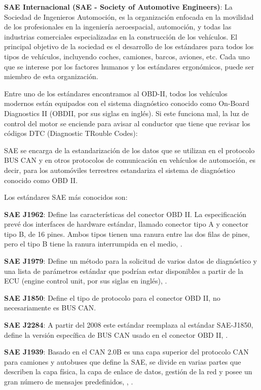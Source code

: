 \textbf{ SAE Internacional (SAE - Society of Automotive Engineers)}: La Sociedad de Ingenieros Automoción, es la organización enfocada en la movilidad de los profesionales en la ingeniería aeroespacial, automoción, y todas las industrias comerciales especializadas en la construcción de los vehículos. El principal objetivo de la sociedad es el desarrollo de los estándares para todos los tipos de vehículos, incluyendo coches, camiones, barcos, aviones, etc. Cada uno que se interese por los factores humanos y los estándares ergonómicos, puede ser miembro de esta organización. 

Entre uno de los estándares encontramos al OBD-II, todos los vehículos modernos están equipados con el sistema diagnóstico conocido como On-Board Diagnostics II (OBDII, por sus siglas en inglés). Si este funciona mal, la luz de control del motor se enciende para avisar al conductor que tiene que revisar los códigos DTC (Diagnostic TRouble Codes):

SAE se encarga de la estandarización de los datos que se utilizan en el protocolo BUS CAN y en otros protocolos de comunicación en vehículos de automoción, es decir, para los automóviles terrestres estandariza el sistema de diagnóstico conocido como OBD II.

Los estándares SAE más conocidos son: 

\textbf{SAE J1962}: Define las características del conector OBD II.  La especificación prevé dos interfaces de hardware estándar, llamado conector tipo A y conector tipo B, de 16 pines. Ambos tipos tienen una ranura entre las dos filas de pines, pero el tipo B tiene la ranura interrumpida en el medio, \cite{J1962}. 

\textbf{SAE J1979}: Define un método para la solicitud de varios datos de diagnóstico y una lista de parámetros estándar que podrían estar disponibles a partir de la ECU (engine control unit, por sus siglas en inglés), \cite{J1979}.

\textbf{SAE J1850}: Define el tipo de protocolo para el conector OBD II, no necesariamente es BUS CAN. 

\textbf{SAE J2284}: A partir del 2008 este estándar reemplaza al estándar SAE-J1850, define la versión específica de BUS CAN usado en el conector OBD II, \cite{J2284}. 

\textbf{SAE J1939}: Basado en el CAN 2.0B es una capa superior del protocolo CAN para camiones y autobuses que define la SAE, se divide en varias partes que describen la capa física, la capa de enlace de datos, gestión de la red y posee un gran número de mensajes predefinidos, \cite{J1939}, \cite{J1939_}.

